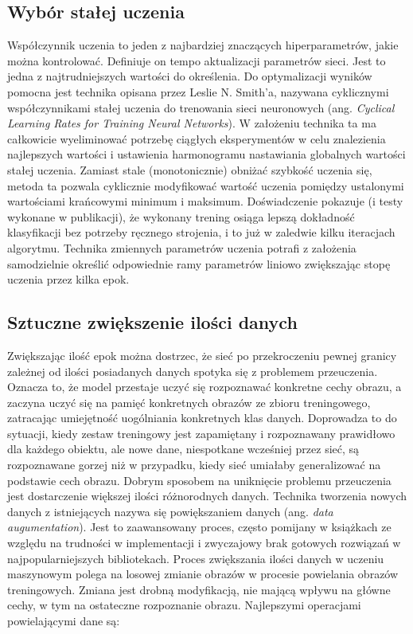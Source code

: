 \documentclass[12pt,a4paper,twoside,titlepage,openright]{book}
\begin{document}
\begin{itemize}
\begin{itemize}
\subsection{Wybór stałej uczenia}
Współczynnik uczenia to jeden z najbardziej znaczących hiperparametrów, jakie można kontrolować. Definiuje on tempo aktualizacji parametrów sieci. Jest to jedna z najtrudniejszych wartości do określenia. Do optymalizacji wyników pomocna jest technika opisana przez Leslie N. Smith’a, nazywana cyklicznymi współczynnikami stałej uczenia do trenowania sieci neuronowych (ang. \textit{Cyclical Learning Rates for Training Neural Networks}). W założeniu technika ta ma całkowicie wyeliminować potrzebę ciągłych eksperymentów w celu znalezienia najlepszych wartości i ustawienia harmonogramu nastawiania globalnych wartości stałej uczenia. Zamiast stale (monotonicznie) obniżać szybkość uczenia się, metoda ta pozwala cyklicznie modyfikować wartość uczenia pomiędzy ustalonymi wartościami krańcowymi minimum i maksimum. Doświadczenie pokazuje (i testy wykonane w publikacji), że wykonany trening osiąga lepszą dokładność klasyfikacji bez potrzeby ręcznego strojenia, i to już w zaledwie kilku iteracjach algorytmu. Technika zmiennych parametrów uczenia potrafi z założenia samodzielnie określić odpowiednie ramy parametrów liniowo zwiększając stopę uczenia przez kilka epok. \cite{DBLP:journals/corr/Smith15a}

\subsection{Sztuczne zwiększenie ilości danych}
Zwiększając ilość epok można dostrzec, że sieć po przekroczeniu pewnej granicy zależnej od ilości posiadanych danych spotyka się z problemem przeuczenia. Oznacza to, że model przestaje uczyć się rozpoznawać konkretne cechy obrazu, a zaczyna uczyć się na pamięć konkretnych obrazów ze zbioru treningowego, zatracając umiejętność uogólniania konkretnych klas danych. Doprowadza to do sytuacji, kiedy zestaw treningowy jest zapamiętany i rozpoznawany prawidłowo dla każdego obiektu, ale nowe dane, niespotkane wcześniej przez sieć, są rozpoznawane gorzej niż w przypadku, kiedy sieć umiałaby generalizować na podstawie cech obrazu.
Dobrym sposobem na uniknięcie problemu przeuczenia jest dostarczenie większej ilości różnorodnych danych. Technika tworzenia nowych danych z istniejących nazywa się powiększaniem danych (ang. \textit{data augumentation}). Jest to zaawansowany proces, często pomijany w książkach ze względu na trudności w implementacji i zwyczajowy brak gotowych rozwiązań w najpopularniejszych bibliotekach. 
Proces zwiększania ilości danych w uczeniu maszynowym polega na losowej zmianie obrazów w procesie powielania obrazów treningowych. Zmiana jest drobną modyfikacją, nie mającą wpływu na główne cechy, w tym na ostateczne rozpoznanie obrazu. Najlepszymi operacjami powielającymi dane są:


\end{itemize}
\end{itemize}
\end{document}
